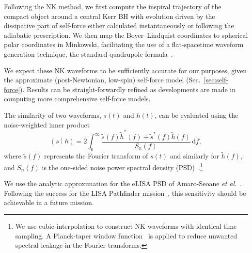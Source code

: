 \documentclass[aps,prd,amsfonts,amssymb,amsmath,nofootinbib,showpacs,superscriptaddress,twocolumn,floatfix]{revtex4-1}
\newcommand{\eqnref}[1]{Eq.~(\ref{eq:#1})}
\newcommand{\secref}[1]{Sec.~\ref{sec:#1}}
\newcommand{\dd}{\ensuremath{\mathrm{d}}}
\newcommand{\intd}[4]{\ensuremath{\int_{#1}^{#2}{#3}\,\dd{#4}}}
\newcommand{\overlap}[2]{\ensuremath{\left(#1\middle|#2\right)}}
\begin{document}
Following the NK method, we first compute the inspiral trajectory of the compact object around a central Kerr BH with evolution driven by the dissipative part of self-force either calculated instantaneously or following the adiabatic prescription. We then map the Boyer--Lindquist coordinates to spherical polar coordinates in Minkowski, facilitating the use of a flat-spacetime waveform generation technique, the standard quadrupole formula~\cite{Misner1973}.

We expect these NK waveforms to be sufficiently accurate for our purposes, given the approximate (post-Newtonian, low-spin) self-force model (\secref{self-force}). Results can be straight-forwardly refined as developments are made in computing more comprehensive self-force models.

The similarity of two waveforms, $s(t)$ and $h(t)$, can be evaluated using the noise-weighted inner product~\cite{Finn1992}
\begin{equation}
\label{eq:innerprod}
\overlap{s}{h} = 2 \intd{0}{\infty}{\frac{\tilde{s}(f)\tilde{h}^*(f)+\tilde{s}^*(f)\tilde{h}(f)}{S_n(f)}}{f},
\end{equation}
where $\tilde{s}(f)$ represents the Fourier transform of $s(t)$ and similarly for $\tilde{h}(f)$, and $S_n(f)$ is the one-sided noise power spectral density (PSD)~\cite{Moore2014a}.\footnote{We use cubic interpolation to construct NK waveforms with identical time sampling. 
A Planck-taper window function~\cite{McKechan2010} is applied to reduce unwanted spectral leakage in the Fourier transforms. 
}

We use the analytic approximation for the eLISA PSD of Amaro-Seoane {\it{et al}}.~\cite{Amaro-Seoane2012a}. Following the success for the LISA Pathfinder mission~\cite{Armano2016}, this sensitivity should be achievable in a future mission.
\end{document}
